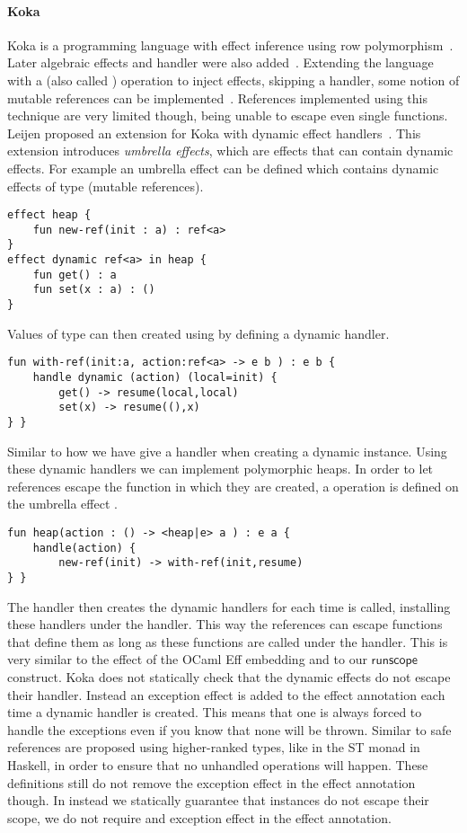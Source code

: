 \paragraph{Koka}
Koka is a programming language with effect inference using row polymorphism~\autocite{koka}.
Later algebraic effects and handler were also added~\autocite{koka2}.
Extending the language with a  (also called ) operation to inject effects, skipping a handler, some notion of mutable references can be implemented~\autocite{handlewithcare}.
References implemented using this technique are very limited though, being unable to escape even single functions.
Leijen proposed an extension for Koka with dynamic effect handlers~\autocite{kokadynamic}.
This extension introduces \emph{umbrella effects}, which are effects that can contain dynamic effects.
For example an umbrella effect  can be defined which contains dynamic effects of type  (mutable references).
\begin{verbatim}
effect heap {
	fun new-ref(init : a) : ref<a>
}
effect dynamic ref<a> in heap {
	fun get() : a
	fun set(x : a) : ()
}
\end{verbatim}

\pagebreak
Values of type  can then created using by defining a dynamic handler.
\begin{verbatim}
fun with-ref(init:a, action:ref<a> -> e b ) : e b {
	handle dynamic (action) (local=init) {
		get() -> resume(local,local)
		set(x) -> resume((),x)
} }
\end{verbatim}
Similar to how we have give a handler when creating a dynamic instance.
Using these dynamic handlers we can implement polymorphic heaps.
In order to let references escape the function in which they are created, a  operation is defined on the umbrella effect .
\begin{verbatim}
fun heap(action : () -> <heap|e> a ) : e a {
	handle(action) {
		new-ref(init) -> with-ref(init,resume)
} }
\end{verbatim}
The  handler then creates the dynamic  handlers for each time  is called, installing these handlers under the  handler.
This way the references can escape functions that define them as long as these functions are called under the  handler.
This is very similar to the  effect of the OCaml Eff embedding and to our $\mathsf{runscope}$ construct.
Koka does not statically check that the dynamic effects do not escape their handler.
Instead an exception effect is added to the effect annotation each time a dynamic handler is created.
This means that one is always forced to handle the exceptions even if you know that none will be thrown.
Similar to \lang{} safe references are proposed using higher-ranked types, like in the ST monad in Haskell, in order to ensure that no unhandled operations will happen.
These definitions still do not remove the exception effect in the effect annotation though.
In \lang{} instead we statically guarantee that instances do not escape their scope, we do not require and exception effect in the effect annotation.

